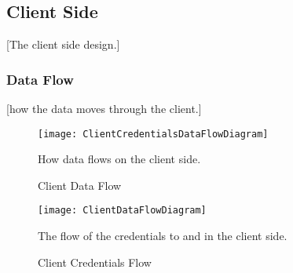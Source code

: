     \subsection{Client Side}\label{Client Side}
        [The client side design.]
        \subsubsection{Data Flow}\label{Data Flow}
        [how the data moves through the client.]
            \begin{figure}[h]
            \centering
            \texttt{[image: ClientCredentialsDataFlowDiagram]}
            \caption{Client Data Flow}
            How data flows on the client side.
            \label{fig:ClientCredentialsDataFlowDiagram}
        \end{figure}
        
        \begin{figure}[h]
            \centering
            \texttt{[image: ClientDataFlowDiagram]}
            \caption{Client Credentials Flow}
            The flow of the credentials to and in the client side.
            \label{fig:ClientDataFlowDiagram}
        \end{figure}
